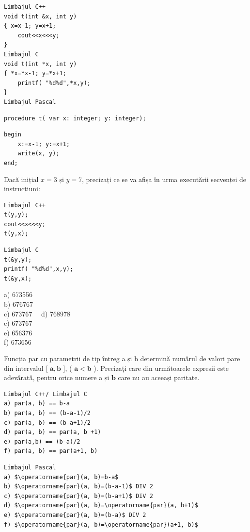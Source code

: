 \documentclass[10pt]{article}
\begin{document}
\begin{verbatim}
Limbajul C++
void t(int &x, int y)
{ x=x-1; y=x+1;
    cout<<x<<<y;
}
Limbajul C
void t(int *x, int y)
{ *x=*x-1; y=*x+1;
    printf( "%d%d",*x,y);
}
Limbajul Pascal
\end{verbatim}

\begin{verbatim}
procedure t( var x: integer; y: integer);
\end{verbatim}

\begin{verbatim}
begin
    x:=x-1; y:=x+1;
    write(x, y);
end;
\end{verbatim}

Dacă inițial $x=3$ și $y=7$, precizați ce se va afișa în urma executării secvenței de instrucțiuni:

\begin{verbatim}
Limbajul C++
t(y,y);
cout<<x<<<y;
t(y,x);
\end{verbatim}

\begin{verbatim}
Limbajul C
t(&y,y);
printf( "%d%d",x,y);
t(&y,x);
\end{verbatim}

a) 673556\\
b) 676767\\
c) $673767 \quad$ d) 768978\\
c) 673767\\
e) 656376\\
f) 673656

Funcția par cu parametrii de tip întreg a și b determină numărul de valori pare din intervalul [ $\mathbf{a}, \mathbf{b}$ ], ( $\mathbf{a}<\mathbf{b}$ ). Precizați care din următoarele expresii este adevărată, pentru orice numere a și $\mathbf{b}$ care nu au aceeași paritate.

\begin{verbatim}
Limbajul C++/ Limbajul C
a) par(a, b) == b-a
b) par(a, b) == (b-a-1)/2
c) par(a, b) == (b-a+1)/2
d) par(a, b) == par(a, b +1)
e) par(a,b) == (b-a)/2
f) par(a, b) == par(a+1, b)
\end{verbatim}

\begin{verbatim}
Limbajul Pascal
a) $\operatorname{par}(a, b)=b-a$
b) $\operatorname{par}(a, b)=(b-a-1)$ DIV 2
c) $\operatorname{par}(a, b)=(b-a+1)$ DIV 2
d) $\operatorname{par}(a, b)=\operatorname{par}(a, b+1)$
e) $\operatorname{par}(a, b)=(b-a)$ DIV 2
f) $\operatorname{par}(a, b)=\operatorname{par}(a+1, b)$
\end{verbatim}
\end{document}
